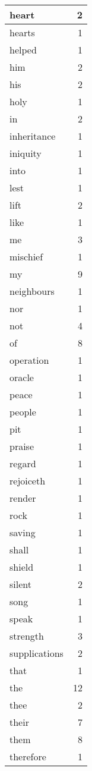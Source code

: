 \begin{center}
\begin{longtable}{l|r}
heart & 2 \\ \hline
hearts & 1 \\ \hline
helped & 1 \\ \hline
him & 2 \\ \hline
his & 2 \\ \hline
holy & 1 \\ \hline
in & 2 \\ \hline
inheritance & 1 \\ \hline
iniquity & 1 \\ \hline
into & 1 \\ \hline
lest & 1 \\ \hline
lift & 2 \\ \hline
like & 1 \\ \hline
me & 3 \\ \hline
mischief & 1 \\ \hline
my & 9 \\ \hline
neighbours & 1 \\ \hline
nor & 1 \\ \hline
not & 4 \\ \hline
of & 8 \\ \hline
operation & 1 \\ \hline
oracle & 1 \\ \hline
peace & 1 \\ \hline
people & 1 \\ \hline
pit & 1 \\ \hline
praise & 1 \\ \hline
regard & 1 \\ \hline
rejoiceth & 1 \\ \hline
render & 1 \\ \hline
rock & 1 \\ \hline
saving & 1 \\ \hline
shall & 1 \\ \hline
shield & 1 \\ \hline
silent & 2 \\ \hline
song & 1 \\ \hline
speak & 1 \\ \hline
strength & 3 \\ \hline
supplications & 2 \\ \hline
that & 1 \\ \hline
the & 12 \\ \hline
thee & 2 \\ \hline
their & 7 \\ \hline
them & 8 \\ \hline
therefore & 1 \\ \hline

\end{longtable}
\end{center}
